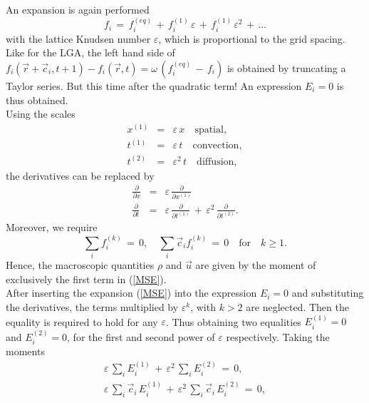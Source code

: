 An expansion is again performed
\begin{equation}
  f_i \,=\, f_i^{(eq)} \,+\, f_i^{(1)} \, \varepsilon \,+\, f_i^{(1)} \, \varepsilon^2 \,+\, ...\label{MSE}
\end{equation}
with the lattice Knudsen number $\varepsilon$, which is proportional to the grid spacing. Like for the LGA, the left hand side of $f_i(\vec r + \vec c_i, t+1)-f_i(\vec r , t)=\omega \, (f_i^{(eq)} \, -\, f_i )$ is obtained by truncating a Taylor series. But this time after the quadratic term! An expression $E_i=0$ is thus obtained.\\[1ex]
Using the scales
\begin{eqnarray}
  x^{(1)} &=& \varepsilon \,x \quad \mbox{spatial},  \nonumber\\ 
  t^{(1)} &=& \varepsilon \,t \quad \mbox{convection},  \nonumber\\ 
  t^{(2)} &=& \varepsilon^2 \,t \quad \mbox{diffusion}, \nonumber
\end{eqnarray}
the derivatives can be replaced by
\begin{eqnarray}
  \frac{\partial{}}{\partial{x}}&=& \varepsilon\, \frac{\partial{}}{\partial{x^{(1)}}}  \nonumber\\
  \frac{\partial{}}{\partial{t}}&=& \varepsilon\, \frac{\partial{}}{\partial{t^{(1)}}} \,+\, \varepsilon^2 \, \frac{\partial{}}{\partial{t^{(2)}}}.\nonumber
\end{eqnarray}
Moreover, we require
\begin{equation}
  \sum_i f_i^{(k)} \,=\,0, \quad \sum_i \vec c_i f_i^{(k)}\,=\,0 \quad \mbox{for} \quad k\ge 1.\nonumber
 \end{equation}
Hence, the macroscopic quantities $\rho$ and $\vec u$ are given by the moment of exclusively the first term in (\ref{MSE}).\\[1ex]
After inserting the expansion (\ref{MSE}) into the expression $E_i=0$ and substituting the derivatives, the terms multiplied by $\varepsilon^k$, with $k>2$ are neglected. Then the equality is required to hold for any $\varepsilon$. Thus obtaining two equalities $E_i^{(1)}=0$ and $E_i^{(2)}=0$, for the first and second power of $\varepsilon$ respectively. Taking the moments
\begin{eqnarray}
 \varepsilon \, \sum_i E_i^{(1)} \,+\,  \varepsilon ^2 \, \sum_i E_i^{(2)}\,=\,0,\nonumber \\
 \varepsilon \, \sum_i \vec c_i \, E_i^{(1)}\,+\,  \varepsilon ^2 \, \sum_i \vec c_i \,E_i^{(2)}\,=\,0, \nonumber
\end{eqnarray}
